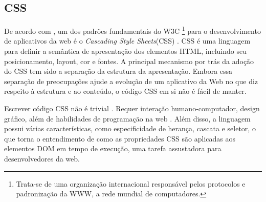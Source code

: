 
\subsection{CSS}
De acordo com \citeauthor{css}, um dos padrões fundamentais do W3C \footnote{Trata-se de uma organização internacional responsável pelos protocolos e padronização da WWW, a rede mundial de computadores.} para o desenvolvimento de aplicativos da web é o \textit{Cascading Style Sheets}(CSS) \cite{Casca8378199:online}. CSS é uma linguagem para definir a semântica de apresentação dos elementos HTML, incluindo seu posicionamento, layout, cor e fontes. A principal mecanismo por trás da adoção do CSS tem sido a separação da estrutura da apresentação. Embora essa separação de preocupações ajude a evolução de um aplicativo da Web no que diz respeito à estrutura e ao conteúdo, o código CSS em si não é fácil de manter.\cite{badros1999constraint}

Escrever código CSS não é trivial \cite{quint2007editing}. Requer interação humano-computador, design gráfico, além de habilidades de programação na web \cite{keller2010css}. Além disso, a linguagem possui várias características, como especificidade de herança, cascata e seletor, o que torna o entendimento de como as propriedades CSS são aplicadas aos elementos DOM em tempo de execução, uma tarefa assustadora para desenvolvedores da web.






